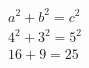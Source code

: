 \documentclass[preview]{standalone}
\begin{document}
\begin{align*}
a^2 + b^2 = c^2 \\ 4^2 + 3^2 = 5^2 \\ 16 + 9 = 25
\end{align*}
\end{document}

